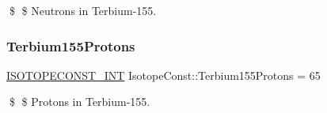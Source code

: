 \$ \$ Neutrons in Terbium-\/155. \mbox{\label{group___isotope_const-_terbium-_tb155_ga9bdd4dc31a78b942253f1deb1c20e3ae}} 
\subsubsection{\texorpdfstring{Terbium155\+Protons}{Terbium155Protons}}
{\footnotesize\ttfamily \mbox{\hyperlink{group___isotope_const-_macros_ga5f18360b3e99483a35c32d789e62621c}{I\+S\+O\+T\+O\+P\+E\+C\+O\+N\+S\+T\+\_\+\+I\+NT}} Isotope\+Const\+::\+Terbium155\+Protons = 65}

\$ \$ Protons in Terbium-\/155. 